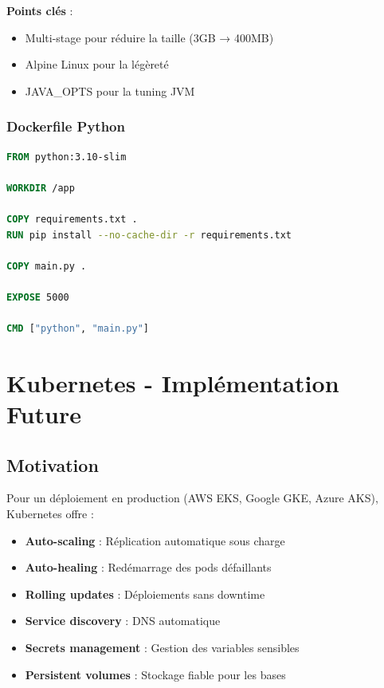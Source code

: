 \documentclass[12pt,a4paper,twoside]{report}
\begin{document}
\textbf{Points clés} :
\begin{itemize}
    \item Multi-stage pour réduire la taille (3GB → 400MB)
    \item Alpine Linux pour la légèreté
    \item JAVA\_OPTS pour la tuning JVM
\end{itemize}

\subsection{Dockerfile Python}

\begin{lstlisting}[language=dockerfile]
FROM python:3.10-slim

WORKDIR /app

COPY requirements.txt .
RUN pip install --no-cache-dir -r requirements.txt

COPY main.py .

EXPOSE 5000

CMD ["python", "main.py"]
\end{lstlisting}

\chapter{Kubernetes - Implémentation Future}

\section{Motivation}

Pour un déploiement en production (AWS EKS, Google GKE, Azure AKS), Kubernetes offre :

\begin{itemize}
    \item \textbf{Auto-scaling} : Réplication automatique sous charge
    \item \textbf{Auto-healing} : Redémarrage des pods défaillants
    \item \textbf{Rolling updates} : Déploiements sans downtime
    \item \textbf{Service discovery} : DNS automatique
    \item \textbf{Secrets management} : Gestion des variables sensibles
    \item \textbf{Persistent volumes} : Stockage fiable pour les bases
\end{itemize}
\end{document}
